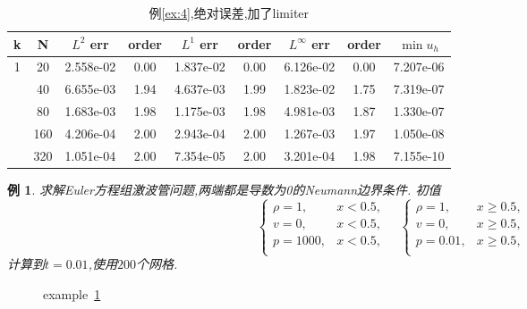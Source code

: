 \documentclass[a4paper, 11pt]{ctexart}
\numberwithin{equation}{section}
\numberwithin{figure}{section}
\newtheorem{example}{例}
\begin{document}
\begin{table}[H]
  \centering
  \begin{tabular}{c|c|c|c|c|c|c|c|c} \toprule
 k  &  N &  $L^2$ err& order&$L^1$ err  &order & $L^\infty$ err&order& $\min u_h$ \\ \midrule
 \multirow{5}{*}{1}  &  20 &2.558e-02 &0.00 &1.837e-02 &0.00 &6.126e-02 &0.00 &7.207e-06 \\
                     &  40 &6.655e-03 &1.94 &4.637e-03 &1.99 &1.823e-02 &1.75 &7.319e-07 \\
                     &  80 &1.683e-03 &1.98 &1.175e-03 &1.98 &4.981e-03 &1.87 &1.330e-07 \\
                     & 160 &4.206e-04 &2.00 &2.943e-04 &2.00 &1.267e-03 &1.97 &1.050e-08 \\
                     & 320 &1.051e-04 &2.00 &7.354e-05 &2.00 &3.201e-04 &1.98 &7.155e-10 \\ \bottomrule
  \end{tabular}
  \caption{例\ref{ex:4},绝对误差,加了limiter}
\end{table}



\begin{example}\label{ex:6}
  求解Euler方程组激波管问题,两端都是导数为0的Neumann边界条件.
  初值
  \begin{equation}
    \begin{cases}
      \rho=1, & x<0.5,\\
      v=0, & x<0.5,\\
      p=1000, & x<0.5,\\
    \end{cases}\quad
    \begin{cases}
      \rho=1, & x\geqslant0.5,\\
      v=0, & x\geqslant0.5,\\
      p=0.01, & x\geqslant0.5,\\
    \end{cases}
  \end{equation}
  计算到$t=0.01$,使用$200$个网格.
\end{example}

\begin{figure}[H]
  \centering
\caption{example~\ref{ex:6}}
\end{figure}
\end{document}
